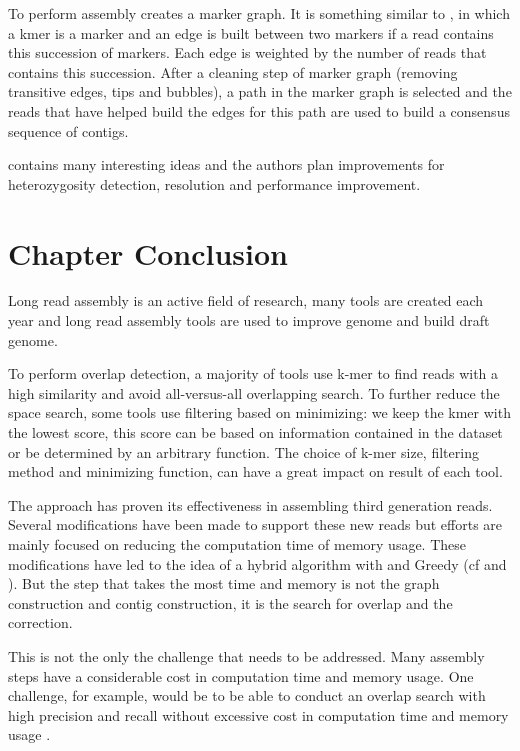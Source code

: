 \documentclass[main]{subfiles}
\begin{document}
To perform assembly \shasta creates a marker graph. It is something similar to \DBG, in which a kmer is a marker and an edge is built between two markers if a read contains this succession of markers. Each edge is weighted by the number of reads that contains this succession. After a cleaning step of marker graph (removing transitive edges, tips and bubbles), a path in the marker graph is selected and the reads that have helped build the edges for this path are used to build a consensus sequence of contigs.

\shasta contains many interesting ideas and the authors plan improvements for heterozygosity detection, resolution and performance improvement.

\section{Chapter Conclusion}

Long read assembly is an active field of research, many tools are created each year and long read assembly tools are used to improve genome and build draft genome.

To perform overlap detection, a majority of tools use k-mer to find reads with a high similarity and avoid all-versus-all overlapping search. To further reduce the space search, some tools use filtering based on minimizing: we keep the kmer with the lowest score, this score can be based on information contained in the dataset or be determined by an arbitrary function. The choice of k-mer size, filtering method and minimizing function, can have a great impact on result of each tool.

The \OLC approach has proven its effectiveness in assembling third generation reads. Several modifications have been made to support these new reads but efforts are mainly focused on reducing the computation time of memory usage. These modifications have led to the idea of a hybrid \OLC algorithm with \DBG and Greedy (cf \flye and \wtdbg). But the step that takes the most time and memory is not the graph construction and contig construction, it is the search for overlap and the correction.

This is not the only the challenge that needs to be addressed. Many assembly steps have a considerable cost in computation time and memory usage. One challenge, for example, would be to be able to conduct an overlap search with high precision and recall without excessive cost in computation time and memory usage \cite{bench_ovl}.
\end{document}

